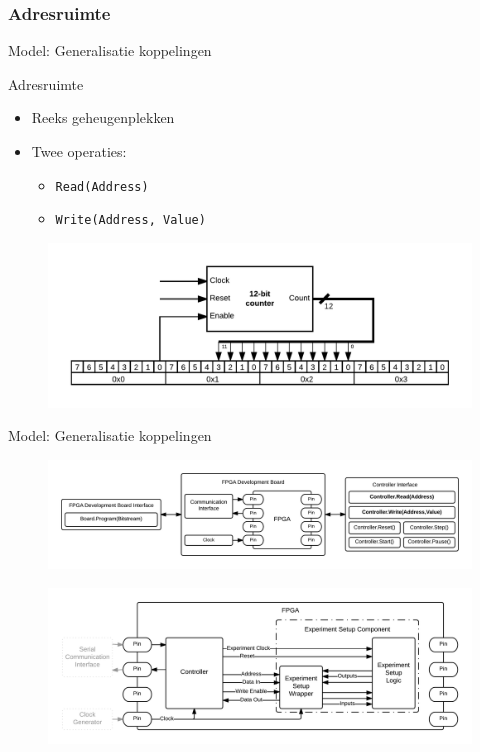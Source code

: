 \documentclass{beamer}
\begin{document}
\subsubsection{Adresruimte}
\begin{frame}{Model: Generalisatie koppelingen}
\begin{block}{Adresruimte}
\begin{itemize}
    \item Reeks geheugenplekken
    \item Twee operaties:
        \begin{itemize}
            \item \texttt{Read(Address)}
            \item \texttt{Write(Address, Value)}
        \end{itemize}
\end{itemize}
\end{block}
\begin{figure}[h]
    \centering
    \includegraphics[width=\textwidth]{img/signal-address-projection}
\end{figure}
\end{frame}

\begin{frame}{Model: Generalisatie koppelingen}
\begin{figure}[h]
    \centering
    \includegraphics[width=\textwidth]{img/overview-abstract}
\end{figure}
\begin{figure}[h]
    \centering
    \includegraphics[width=\textwidth]{img/fpga-abstract}
\end{figure}
\end{frame}
\end{document}

